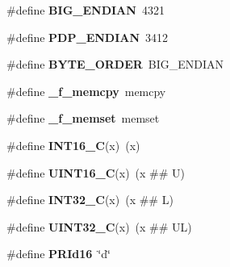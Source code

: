 \begin{DoxyCompactItemize}
\item 
\hypertarget{group__hal__hcs08_ga23eb5e058a210efdde3d64e69679fafa}{\#define {\bfseries B\-I\-G\-\_\-\-E\-N\-D\-I\-A\-N}~4321}\label{group__hal__hcs08_ga23eb5e058a210efdde3d64e69679fafa}

\item 
\hypertarget{group__hal__hcs08_ga2026615c7441e0b093ff7389f46f7654}{\#define {\bfseries P\-D\-P\-\_\-\-E\-N\-D\-I\-A\-N}~3412}\label{group__hal__hcs08_ga2026615c7441e0b093ff7389f46f7654}

\item 
\hypertarget{group__hal__hcs08_ga1771b7fb65ee640524d0052f229768c3}{\#define {\bfseries B\-Y\-T\-E\-\_\-\-O\-R\-D\-E\-R}~B\-I\-G\-\_\-\-E\-N\-D\-I\-A\-N}\label{group__hal__hcs08_ga1771b7fb65ee640524d0052f229768c3}

\item 
\hypertarget{group__hal__hcs08_ga3ee5b5bde5321e97420753cf13ce9c1b}{\#define {\bfseries \-\_\-f\-\_\-memcpy}~memcpy}\label{group__hal__hcs08_ga3ee5b5bde5321e97420753cf13ce9c1b}

\item 
\hypertarget{group__hal__hcs08_ga210604a4d70c1421599afca049c8dc55}{\#define {\bfseries \-\_\-f\-\_\-memset}~memset}\label{group__hal__hcs08_ga210604a4d70c1421599afca049c8dc55}

\item 
\hypertarget{group__hal__hcs08_ga838b261fec725cb0f5d5b6769d3521e7}{\#define {\bfseries I\-N\-T16\-\_\-\-C}(x)~(x)}\label{group__hal__hcs08_ga838b261fec725cb0f5d5b6769d3521e7}

\item 
\hypertarget{group__hal__hcs08_ga1cb39a2cfaf899fd38730c7637807708}{\#define {\bfseries U\-I\-N\-T16\-\_\-\-C}(x)~(x \#\# U)}\label{group__hal__hcs08_ga1cb39a2cfaf899fd38730c7637807708}

\item 
\hypertarget{group__hal__hcs08_gad78650fb7726f4e99205406569ef403d}{\#define {\bfseries I\-N\-T32\-\_\-\-C}(x)~(x \#\# L)}\label{group__hal__hcs08_gad78650fb7726f4e99205406569ef403d}

\item 
\hypertarget{group__hal__hcs08_ga2451a7ede7ebd810357f1503e9898ea6}{\#define {\bfseries U\-I\-N\-T32\-\_\-\-C}(x)~(x \#\# U\-L)}\label{group__hal__hcs08_ga2451a7ede7ebd810357f1503e9898ea6}

\item 
\hypertarget{group__hal__hcs08_ga087e50fe0283aacc71d7138d13e91939}{\#define {\bfseries P\-R\-Id16}~\char`\"{}d\char`\"{}}\label{group__hal__hcs08_ga087e50fe0283aacc71d7138d13e91939}


\end{DoxyCompactItemize}
